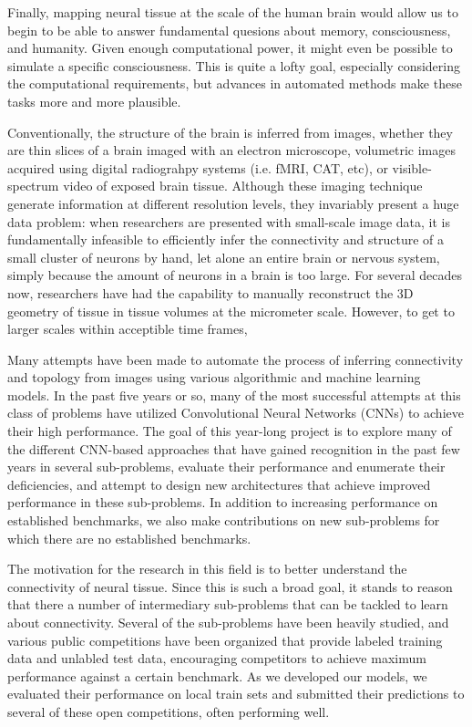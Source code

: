 Finally, mapping neural tissue at the scale of the human brain would allow us to begin to be able to answer fundamental quesions about memory, consciousness, and humanity. Given enough computational power, it might even be possible to simulate a specific consciousness. This is quite a lofty goal, especially considering the computational requirements, but advances in automated methods make these tasks more and more plausible.

Conventionally, the structure of the brain is inferred from images, whether they are thin slices of a brain imaged with an electron microscope, volumetric images acquired using digital radiograhpy systems (i.e. fMRI, CAT, etc), or visible-spectrum video of exposed brain tissue. Although these imaging technique generate information at different resolution levels, they invariably present a huge data problem: when researchers are presented with small-scale image data, it is fundamentally infeasible to efficiently infer the connectivity and structure of a small cluster of neurons by hand, let alone an entire brain or nervous system, simply because the amount of neurons in a brain is too large. For several decades now, researchers have had the capability to manually reconstruct the 3D geometry of tissue in tissue volumes at the micrometer scale\cite{White1986}. However, to get to larger scales within acceptible time frames, 

Many attempts have been made to automate the process of inferring connectivity and topology from images using various algorithmic and machine learning models. In the past five years or so, many of the most successful attempts at this class of problems have utilized Convolutional Neural Networks (CNNs) to achieve their high performance. The goal of this year-long project is to explore many of the different CNN-based approaches that have gained recognition in the past few years in several sub-problems, evaluate their performance and enumerate their deficiencies, and attempt to design new architectures that achieve improved performance in these sub-problems. In addition to increasing performance on established benchmarks, we also make contributions on new sub-problems for which there are no established benchmarks.

The motivation for the research in this field is to better understand the connectivity of neural tissue. Since this is such a broad goal, it stands to reason that there a number of intermediary sub-problems that can be tackled to learn about connectivity. Several of the sub-problems have been heavily studied, and various public competitions have been organized that provide labeled training data and unlabled test data, encouraging competitors to achieve maximum performance against a certain benchmark. As we developed our models, we evaluated their performance on local train sets and submitted their predictions to several of these open competitions, often performing well.

